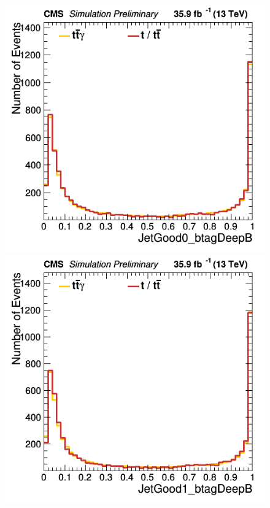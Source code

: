 \documentclass[11pt]{scrartcl}
\begin{document}
	\begin{figure}[H]
	\centering
	\begin{minipage}{.5\textwidth}
	  \centering
	  \includegraphics[width=0.7\linewidth]{figures/Notused/JetGood0_btagDeepB.png}
	\end{minipage}%
	\begin{minipage}{.5\textwidth}
	  \centering
	  \includegraphics[width=0.7\linewidth]{figures/Notused/JetGood1_btagDeepB.png}
	\end{minipage}
	\end{figure}
	
\end{document}
